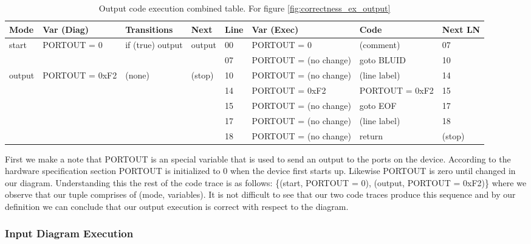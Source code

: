 \begin{table}[htcb]
	\caption{Output code execution combined table. For figure \ref{fig:correctness_ex_output}}
	\centering
	\tablefontsize
		\begin{tabular}{| p{} | p{} | p{} | p{} | p{} | p{} | p{} | p{} |}
			\hline
			\textbf{Mode} 		&	\textbf{Var (Diag)} 		& 	\textbf{Transitions} 		& 	\textbf{Next}		&	\textbf{Line}		&	\textbf{Var (Exec)	}	&	\textbf{Code}	&	\textbf{Next LN} \\
			\hline
			start 				&	PORTOUT = 0					&	if (true) output			&	output				&	00					&	PORTOUT = 0				& 	(comment)		&	07 \\
			\hline
								&								&								&						&	07					&   PORTOUT = (no change)	&	goto BLUID		&	10 \\
			\hline
			output				&	PORTOUT = 0xF2				&	(none)						&	(stop)				&	10					&	PORTOUT = (no change)	&	(line label)	&	14 \\
			\hline
								&								&								&						&	14					&	PORTOUT = 0xF2			&	PORTOUT = 0xF2	&	15 \\
			\hline
								&								&								&						&	15					&	PORTOUT = (no change)	&	goto EOF		&	17 \\
			\hline
								&								&								&						&	17					&	PORTOUT = (no change)	&	(line label)	&	18 \\
			\hline
								&								&								&						&	18					&	PORTOUT = (no change)	&	return			&	(stop) \\
			\hline
		\end{tabular}
	\label{table:OutputExecCombined}
\end{table}

First we make a note that PORTOUT is an special variable that is 
used to send an output to the ports on the device.
According to the hardware specification section PORTOUT is initialized 
to 0 when the device first starts up. Likewise PORTOUT is zero until 
changed in our diagram. Understanding this the rest of the code trace 
is as follows: \{(start, PORTOUT = 0), (output, PORTOUT = 0xF2)\} where
we observe that our tuple comprises of (mode, variables). 
It is not difficult to see that our two code traces produce this
sequence and by our definition we can conclude that our
output execution is correct with respect to the diagram.


\subsubsection{Input Diagram Execution}

